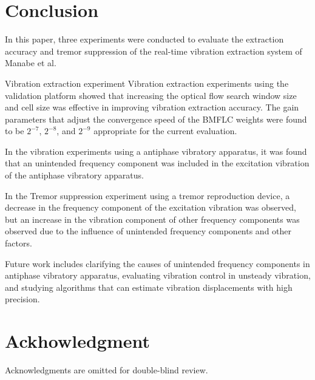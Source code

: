\section{Conclusion}\label{section:conclusion}





In this paper, three experiments were conducted to evaluate the extraction accuracy
and tremor suppression of the real-time vibration extraction system of Manabe et al.

Vibration extraction experiment
Vibration extraction experiments using the validation platform showed that
increasing the optical flow search window size and cell size was effective in improving
vibration extraction accuracy.
The gain parameters that adjust the convergence speed of the BMFLC weights
were found to be $2^{-7}$, $2^{-8}$, and $2^{-9}$ appropriate for the current evaluation.

In the vibration experiments using a antiphase vibratory apparatus,
it was found that an unintended frequency component was included in the excitation vibration
of the antiphase vibratory apparatus.

In the Tremor suppression experiment using a tremor reproduction device,
a decrease in the frequency component of the excitation vibration was observed,
but an increase in the vibration component of other frequency components
was observed due to the influence of unintended frequency components and other factors.


Future work includes clarifying the causes of unintended frequency components
in antiphase vibratory apparatus, evaluating vibration control in unsteady vibration,
and studying algorithms that can estimate vibration displacements with high precision.


\section{Ackhowledgment}\label{section:ackhowledgment}
Acknowledgments are omitted for double-blind review.
